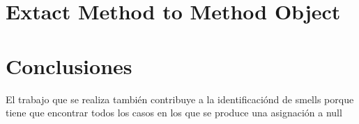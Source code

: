 \documentclass[11pt,a4paper,twoside]{tesis}
\begin{document}

\chapter{Extact Method to Method Object}



\chapter{Conclusiones}

El trabajo que se realiza también contribuye a la identificaciónd de smells porque tiene que
encontrar todos los casos en los que se produce una asignación a null



\backmatter
%
\end{document}
